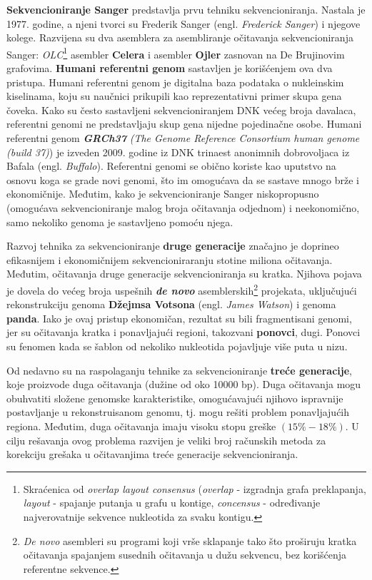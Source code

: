 \documentclass[12pt,oneside]{memoir}
\begin{document}
\textbf{Sekvencioniranje Sanger} predstavlja prvu tehniku sekvencioniranja. Nastala je 1977. godine, a njeni tvorci su Frederik Sanger (engl. \textit{Frederick Sanger}) i njegove kolege. Razvijena su dva asemblera za asembliranje očitavanja sekvencioniranja Sanger: \textit{OLC}\footnote{Skraćenica od \textit{overlap layout consensus} (\textit{overlap} - izgradnja grafa preklapanja,
\textit{layout} - spajanje putanja u grafu u kontige, \textit{concensus} - određivanje najverovatnije sekvence
nukleotida za svaku kontigu.} asembler \textbf{Celera} i asembler \textbf{Ojler} zasnovan na De Brujinovim grafovima. \textbf{Humani referentni genom} sastavljen je korišćenjem ova dva pristupa. Humani referentni genom je digitalna baza podataka o nukleinskim kiselinama, koju su naučnici prikupili kao reprezentativni primer skupa gena čoveka. Kako su često sastavljeni sekvencioniranjem DNK većeg broja davalaca, referentni genomi ne predstavljaju skup gena nijedne pojedinačne osobe. Humani referentni genom \textit{\textbf{GRCh37}} \textit{(The Genome Reference Consortium human genome (build 37)}) je izveden 2009. godine iz DNK trinaest anonimnih dobrovoljaca iz Bafala (engl. \textit{Buffalo}). Referentni genomi se obično koriste kao uputstvo na osnovu koga se grade novi genomi, što im omogućava da se sastave mnogo brže i ekonomičnije. Međutim, kako je sekvencioniranje Sanger niskopropusno (omogućava sekvencioniranje malog broja očitavanja odjednom) i neekonomično, samo nekoliko genoma je sastavljeno pomoću njega.

Razvoj tehnika za sekvencioniranje \textbf{druge generacije} značajno je doprineo efikasnijem i ekonomičnijem sekvencioniraranju stotine miliona očitavanja. Međutim, očitavanja druge generacije sekvencioniranja su kratka. Njihova pojava je dovela do većeg broja uspešnih \textbf{\textit{de novo}} asemblerskih\footnote{\textit{De novo} asembleri su programi
koji vrše sklapanje tako što proširuju kratka očitavanja spajanjem susednih
očitavanja u dužu sekvencu, bez korišćenja referentne sekvence.} projekata, uključujući rekonstrukciju genoma \textbf{Džejmsa Votsona} (engl. \textit{James Watson}) i genoma \textbf{panda}. Iako je ovaj pristup ekonomičan, rezultat su bili fragmentisani genomi, jer su očitavanja kratka i ponavljajući regioni, takozvani \textbf{ponovci}, dugi. Ponovci su fenomen kada se šablon od nekoliko nukleotida pojavljuje više puta u nizu.

Od nedavno su na raspolaganju tehnike za sekvencioniranje \textbf{treće generacije}, koje proizvode duga očitavanja (dužine od oko 10000 bp). Duga očitavanja mogu obuhvatiti složene genomske karakteristike, omogućavajući njihovo ispravnije postavljanje u rekonstruisanom genomu, tj. mogu rešiti problem ponavljajućih regiona. Međutim, duga očitavanja imaju visoku stopu greške $(15\%-18\%)$. U cilju rešavanja ovog problema razvijen je veliki broj računskih metoda za korekciju grešaka u očitavanjima treće generacije sekvencioniranja.
\end{document}

